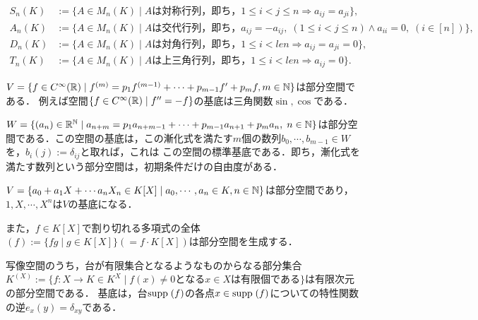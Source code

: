 \documentclass[uplatex, 12pt, dvipdfmx]{jsreport}
\begin{document}
\begin{example}
    \begin{align*}
        S_n(K)&:=\{A\in M_n(K)\mid Aは対称行列，即ち，1\le i<j\le n\Rightarrow a_{ij}=a_{ji}\},\\
        A_n(K)&:=\{A\in M_n(K)\mid Aは交代行列，即ち，a_{ij}=-a_{ij},\;(1\le i<j\le n)\land a_{ii}=0,\;(i\in[n])\},\\
        D_n(K)&:=\{A\in M_n(K)\mid Aは対角行列，即ち，1\le i<le n\Rightarrow a_{ij}=a_{ji}=0\},\\
        T_n(K)&:=\{A\in M_n(K)\mid Aは上三角行列，即ち，1\le i<le n\Rightarrow a_{ij}=0\}.
    \end{align*}
\end{example}

\begin{example}
    $V=\{f\in C^\infty(\mathbb{R})\mid f^{(m)}=p_1f^{(m-1)}+\cdots+p_{m-1}f'+p_mf, m\in\mathbb{N}\}$は部分空間である．
    例えば空間$\{f\in C^\infty(\mathbb{R})\mid f''=-f\}$の基底は三角関数$\sin,\cos$である．
\end{example}

\begin{example}
    $W=\{(a_n)\in\mathbb{R}^{\mathbb{N}}\mid a_{n+m}=p_1a_{n+m-1}+\cdots+p_{m-1}a_{n+1}+p_ma_n,\;n\in\mathbb{N}\}$は部分空間である．この空間の基底は，この漸化式を満たす$m$個の数列$b_0,\cdots,b_{m-1}\in W$を，$b_i(j):=\delta_{ij}$と取れば，これは
    この空間の標準基底である．即ち，漸化式を満たす数列という部分空間は，初期条件だけの自由度がある．
\end{example}

\begin{example}
    $V=\{a_0+a_1X+\cdots a_nX_n\in K[X]\mid a_0,\cdots,a_n\in K,n\in\mathbb{N}\}$は部分空間であり，$1,X,\cdots,X^n$は$V$の基底になる．

    また，$f\in K[X]$で割り切れる多項式の全体$(f):=\{fg\mid g\in K[X]\}(=f\cdot K[X])$は部分空間を生成する．
\end{example}

\begin{example}
    写像空間のうち，台が有限集合となるようなものからなる部分集合$K^{(X)}:=\{f:X\to K\in K^X\mid f(x)\ne 0となるx\in Xは有限個である\}$は有限次元の部分空間である．
    基底は，台$\mathrm{supp}\;(f)$の各点$x\in\mathrm{supp}\;(f)$についての特性関数の逆$e_x(y)=\delta_{xy}$である．
\end{example}
\end{document}
